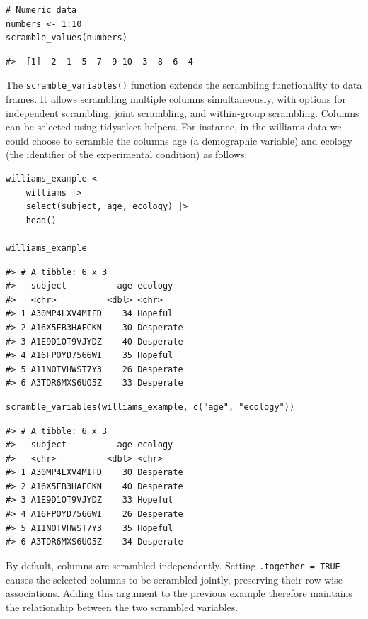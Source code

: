 \begin{verbatim}
# Numeric data
numbers <- 1:10
scramble_values(numbers)
\end{verbatim}

\begin{verbatim}
#>  [1]  2  1  5  7  9 10  3  8  6  4
\end{verbatim}

The \texttt{scramble\_variables()} function extends the scrambling functionality to data frames. It allows scrambling multiple columns simultaneously, with options for independent scrambling, joint scrambling, and within-group scrambling. Columns can be selected using tidyselect helpers. For instance, in the williams data we could choose to scramble the columns age (a demographic variable) and ecology (the identifier of the experimental condition) as follows:

\begin{verbatim}
williams_example <-
    williams |>
    select(subject, age, ecology) |> 
    head()

williams_example
\end{verbatim}

\begin{verbatim}
#> # A tibble: 6 x 3
#>   subject          age ecology  
#>   <chr>          <dbl> <chr>    
#> 1 A30MP4LXV4MIFD    34 Hopeful  
#> 2 A16X5FB3HAFCKN    30 Desperate
#> 3 A1E9D1OT9VJYDZ    40 Desperate
#> 4 A16FPOYD7566WI    35 Hopeful  
#> 5 A11NOTVHWST7Y3    26 Desperate
#> 6 A3TDR6MXS6UO5Z    33 Desperate
\end{verbatim}

\begin{verbatim}
scramble_variables(williams_example, c("age", "ecology"))
\end{verbatim}

\begin{verbatim}
#> # A tibble: 6 x 3
#>   subject          age ecology  
#>   <chr>          <dbl> <chr>    
#> 1 A30MP4LXV4MIFD    30 Desperate
#> 2 A16X5FB3HAFCKN    40 Desperate
#> 3 A1E9D1OT9VJYDZ    33 Hopeful  
#> 4 A16FPOYD7566WI    26 Desperate
#> 5 A11NOTVHWST7Y3    35 Hopeful  
#> 6 A3TDR6MXS6UO5Z    34 Desperate
\end{verbatim}

By default, columns are scrambled independently. Setting \texttt{.together\ =\ TRUE} causes the selected columns to be scrambled jointly, preserving their row-wise associations. Adding this argument to the previous example therefore maintains the relationship between the two scrambled variables.

